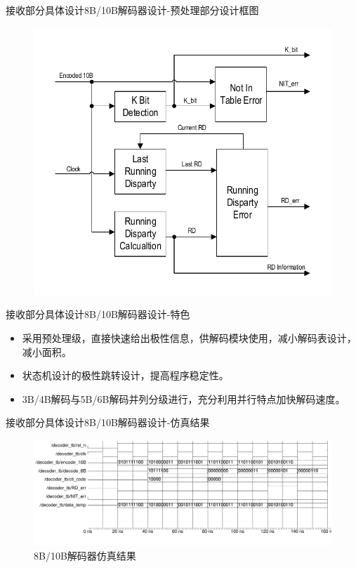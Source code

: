\documentclass{beamer}
\begin{document}
\begin{frame}{接收部分具体设计}{8B/10B解码器设计-预处理部分设计框图}
  \begin{figure}
  \centering
  \includegraphics[scale=0.5]{./img/8b10b_preprocess_model.pdf}
  \end{figure}
\end{frame}

\begin{frame}{接收部分具体设计}{8B/10B解码器设计-特色}
	\begin{itemize}
	\item 采用预处理级，直接快速给出极性信息，供解码模块使用，减小解码表设计，减小面积。
	\item 状态机设计的极性跳转设计，提高程序稳定性。
	\item 3B/4B解码与5B/6B解码并列分级进行，充分利用并行特点加快解码速度。
	\end{itemize}
\end{frame}

\begin{frame}{接收部分具体设计}{8B/10B解码器设计-仿真结果}
  \begin{figure}
  \includegraphics[scale=0.4]{./img/8b_10b_decoder_wave.pdf}
	\caption{8B/10B解码器仿真结果}
  \end{figure}
\end{frame}
\end{document}
